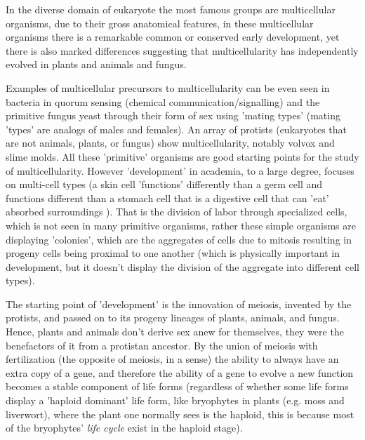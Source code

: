 In the diverse domain of eukaryote the most famous groups are multicellular organisms, due to their gross anatomical features, in these multicellular organisms there is a remarkable common or conserved early development, yet there is also marked differences suggesting that multicellularity has independently evolved in plants and animals and fungus.  

Examples of multicellular precursors to multicellularity can be even seen in bacteria in quorum sensing (chemical communication/signalling) and the primitive fungus yeast through their form of sex using 'mating types' (mating 'types' are analogs of males and females)\cite{pmid7579526}. An array of protists (eukaryotes that are not animals, plants, or fungus) show multicellularity, notably volvox and slime molds.  All these 'primitive' organisms are good starting points for the study of multicellularity.  However 'development' in academia, to a large degree, focuses on multi-cell types (a skin cell 'functions' differently than a germ cell and functions different than a stomach cell that is a digestive cell that can 'eat' absorbed surroundings ).  That is the division of labor through specialized cells, which is not seen in many primitive organisms, rather these simple organisms are displaying 'colonies', which are the aggregates of cells due to mitosis resulting in progeny cells being proximal to one another (which is physically important in development, but it doesn't display the division of the aggregate into different cell types).

The starting point of 'development' is the innovation of meiosis, invented by the protists, and passed on to its progeny lineages of plants, animals, and fungus.  Hence, plants and animals don't derive sex anew for themselves, they were the benefactors of it from a protistan ancestor.  By the union of meiosis with fertilization (the opposite of meiosis, in a sense) the ability to always have an extra copy of a gene, and therefore the ability of a gene to evolve a new function becomes a stable component of life forms (regardless of whether some life forms display a 'haploid dominant' life form, like bryophytes in plants (e.g. moss and liverwort), where the plant one normally sees is the haploid, this is because most of the bryophytes' \textit{life cycle} exist in the haploid stage).


